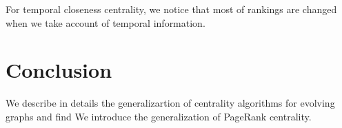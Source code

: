 \documentclass[12pt]{article}
\theoremstyle{definition}
\begin{document}
For temporal closeness centrality, we notice that most of rankings are changed when we take account of temporal information.


%
%
%
%
%
%
%
%

\section{Conclusion}
\label{sec:conclusion}

We describe in details the generalizartion of centrality algorithms for evolving graphs and find
We introduce the generalization of PageRank centrality.



\end{document}
